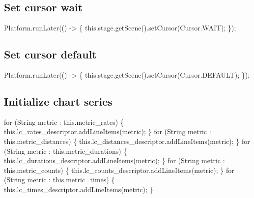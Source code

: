 \subsection{Set cursor wait}
\nwenddocs{}\endmoddef{}
Platform.runLater(() -> \{
  this.stage.getScene().setCursor(Cursor.WAIT);
\});
\nwendcode{}\nwdocspar

\subsection{Set cursor default}
\nwenddocs{}\endmoddef{}
Platform.runLater(() -> \{
  this.stage.getScene().setCursor(Cursor.DEFAULT);
\});
\nwendcode{}\nwdocspar

\subsection{Initialize chart series}
\nwenddocs{}\endmoddef{}
for (String metric : this.metric_rates) \{
  this.lc_rates_descriptor.addLineItems(metric);
\}
for (String metric : this.metric_distances) \{
  this.lc_distances_descriptor.addLineItems(metric);
\}
for (String metric : this.metric_durations) \{
  this.lc_durations_descriptor.addLineItems(metric);
\}
for (String metric : this.metric_counts) \{
  this.lc_counts_descriptor.addLineItems(metric);
\}
for (String metric : this.metric_times) \{
  this.lc_times_descriptor.addLineItems(metric);
\}
\nwendcode{}\nwdocspar

